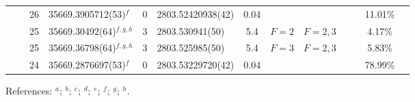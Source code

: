 \begin{table*}
\begin{center}
{\begin{tabular}{:l;l;c;l;c;l;c;l;l;c;c;c;c}
\rowstyle{\itshape}               &        & 26        & 35669.3905712(53)$^{f}$          & 0 & 2803.52420938(42)  & 0.04 & $                                        $ & $                                        $ &             &              & 11.01\%   & $     ^{}     $\\
\rowstyle{\itshape}               &        & 25        & 35669.30492(64)$^{f,g,h}$        & 3 &   2803.530941(50)  &  5.4 & $F=2                                     $ & $F=2,3                                   $ &             &              & 4.17\%    & $     ^{}     $\\
\rowstyle{\itshape}               &        & 25        & 35669.36798(64)$^{f,g,h}$        & 3 &   2803.525985(50)  &  5.4 & $F=3                                     $ & $F=2,3                                   $ &             &              & 5.83\%    & $     ^{}     $\\
\rowstyle{\itshape}               &        & 24        & 35669.2876697(53)$^{f}$          & 0 & 2803.53229720(42)  & 0.04 & $                                        $ & $                                        $ &             &              & 78.99\%   & $     ^{}     $\\
\hline
\end{tabular}
}
{\footnotesize References:
$^{a}$\citet{Berengut:2005:044501};
$^{b}$\citet{Savukov:2008:042501};
$^{c}$\citet{Hannemann:2006:012505};
$^{d}$\citet{Salumbides:2006:L41};
$^{e}$\citet{Dzuba:2007:062510};
$^{f}$\citet{Batteiger:2009:022503};
$^{g}$\citet{Itano:1981:1364};
$^{h}$\citet{Sur:2005:25}.}
\end{center}
\end{table*}
